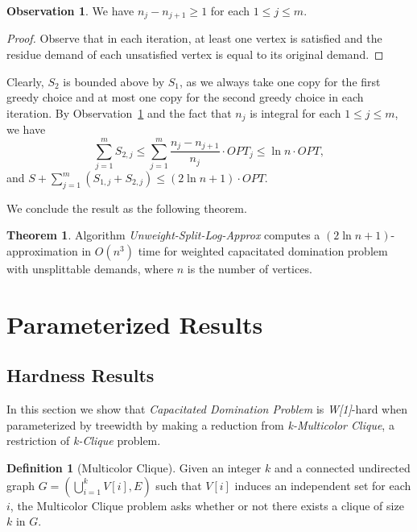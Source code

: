 \documentclass[a4paper,11pt]{article}
\theoremstyle{definition}
\newtheorem{definition}{Definition}
\newtheorem{observation}{Observation}
\newtheorem{theorem}{Theorem}
\begin{document}
\begin{observation} \label{observation_unweighted_splittable_n_decrese}
We have $n_j - n_{j+1} \ge 1$ for each $1 \le j \le m$.
\end{observation}

\begin{proof}
Observe that in each iteration, at least one vertex is satisfied and the residue demand of each unsatisfied vertex is equal to its original demand.
\end{proof}

Clearly, $S_2$ is bounded above by $S_1$, as we always take one copy for the first greedy choice and at most one copy for the second greedy choice in each iteration.
By Observation~\ref{observation_unweighted_splittable_n_decrese} and the fact that $n_j$ is integral for each $1 \le j \le m$, we have 
$$\sum_{j=1}^mS_{2,j} \le \sum_{j=1}^m \frac{n_j - n_{j+1}}{n_j}\cdot OPT_j \le \ln n\cdot OPT,$$
and $S+\sum_{j=1}^m\left(S_{1,j}+S_{2,j}\right) \le (2\ln n+1) \cdot OPT.$

We conclude the result as the following theorem.

\begin{theorem}
Algorithm {\em Unweight-Split-Log-Approx} computes
a $(2\ln n + 1)$-approximation in $O(n^3)$ time for weighted capacitated domination
problem with unsplittable demands, where $n$ is the number of
vertices.
\end{theorem}



\section{Parameterized Results} \label{parameterized_results}

\subsection{Hardness Results} \label{section_w_1_hardness}

In this section we show that {\em Capacitated Domination Problem} is {\it W[1]}-hard when parameterized by
treewidth by making a reduction from {\em k-Multicolor Clique}, a
restriction of {\em k-Clique} problem.

\begin{definition}[\sc Multicolor Clique]
Given an integer $k$ and a connected undirected graph $G = \left(\bigcup_{i=1}^k V[i], E\right)$ such that $V[i]$ induces an independent set for each $i$, the {\sc Multicolor Clique} problem asks whether or not there exists a clique of size $k$ in $G$.
\end{definition}
\end{document}
